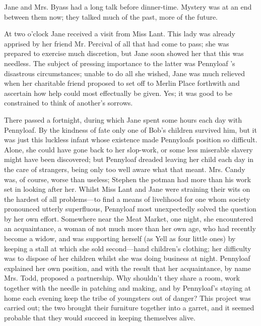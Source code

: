 Jane and Mrs. Byass had a long talk before dinner-time. Mystery was at
an end between them now; they talked much of the past, more of the
future.

At two o'clock Jane received a visit from Miss Lant. This lady was
already apprised by her friend Mr. Percival of all that had come {}to
pass; she was prepared to exercise much discretion, but Jane soon showed
her that this was needless. The subject of pressing importance to the
latter was Pennyloaf 's disastrous circumstances; unable to do all she
wished, Jane was much relieved when her charitable friend proposed to
set off to Merlin Place forthwith and ascertain how help could most
effectually be given. Yes; it was good to be constrained to think of
another's sorrows.

There passed a fortnight, during which Jane spent some hours each day
with Pennyloaf. By the kindness of fate only one of Bob's children
survived him, but it was just this luckless infant whose existence made
Pennyloafs position so difficult. Alone, she could have gone back to her
slop-work, or some less miserable slavery might have been discovered;
but Pennyloaf dreaded leaving her child each day in the care of
strangers, being only too well aware what that meant. Mrs. Candy was, of
course, worse than useless; Stephen the potman had more than his work
set in looking after her. Whilst Miss Lant and Jane were straining their
wits on the hardest of all problems---to find a means of livelihood for
one {}whom society pronounced utterly superfluous, Pennyloaf most
unexpectedly solved the question by her own effort. Somewhere near the
Meat Market, one night, she encountered an acquaintance, a woman of not
much more than her own age, who had recently become a widow, and was
supporting herself (as Yell as four little ones) by keeping a stall at
which she sold second---hand children's clothing; her difficulty was to
dispose of her children whilst she was doing business at night.
Pennyloaf explained her own position, and with the result that her
acquaintance, by name Mrs. Todd, proposed a partnership. Why shouldn't
they share a room, work together with the needle in patching and making,
and by Pennyloaf's staying at home each evening keep the tribe of
youngsters out of danger? This project was carried out; the two brought
their furniture together into a garret, and it seemed probable that they
would succeed in keeping themselves alive.

